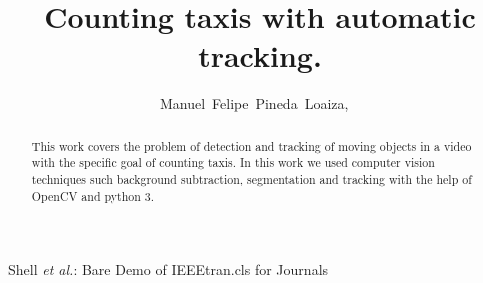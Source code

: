 \documentclass[journal]{IEEEtran}
\begin{document}
%
\title{Counting taxis with automatic tracking.}
%
%
%

\author{
  Manuel~Felipe~Pineda~Loaiza,
  ~
}


%
%



%
{Shell \MakeLowercase{\textit{et al.}}: Bare Demo of IEEEtran.cls for Journals}


\maketitle


\begin{abstract}
This work covers the problem of detection and tracking of moving objects in a
video with the specific goal of counting taxis. In this work we used computer
vision techniques such background subtraction, segmentation and tracking with
the help of OpenCV and python 3.
\end{abstract}
\end{document}
